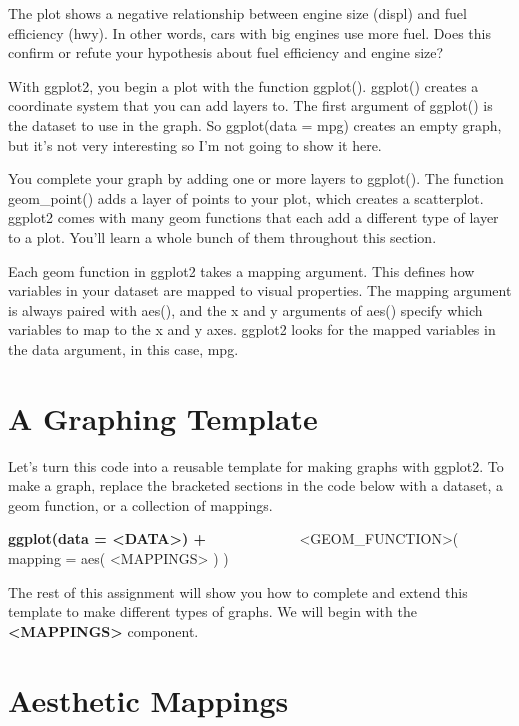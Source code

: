 \documentclass[
  letterpaper,
  DIV=11,
  numbers=noendperiod]{scrreprt}
\begin{document}
The plot shows a negative relationship between engine size (displ) and
fuel efficiency (hwy). In other words, cars with big engines use more
fuel. Does this confirm or refute your hypothesis about fuel efficiency
and engine size?

With ggplot2, you begin a plot with the function ggplot(). ggplot()
creates a coordinate system that you can add layers to. The first
argument of ggplot() is the dataset to use in the graph. So ggplot(data
= mpg) creates an empty graph, but it's not very interesting so I'm not
going to show it here.

You complete your graph by adding one or more layers to ggplot(). The
function geom\_point() adds a layer of points to your plot, which
creates a scatterplot. ggplot2 comes with many geom functions that each
add a different type of layer to a plot. You'll learn a whole bunch of
them throughout this section.

Each geom function in ggplot2 takes a mapping argument. This defines how
variables in your dataset are mapped to visual properties. The mapping
argument is always paired with aes(), and the x and y arguments of aes()
specify which variables to map to the x and y axes. ggplot2 looks for
the mapped variables in the data argument, in this case, mpg.

\section*{A Graphing Template}\label{a-graphing-template}


Let's turn this code into a reusable template for making graphs with
ggplot2. To make a graph, replace the bracketed sections in the code
below with a dataset, a geom function, or a collection of mappings.

\textbf{ggplot(data = \textless DATA\textgreater) +} \(\hspace{1in}\)
\textless GEOM\_FUNCTION\textgreater( mapping = aes(
\textless MAPPINGS\textgreater{} ) )

The rest of this assignment will show you how to complete and extend
this template to make different types of graphs. We will begin with the
\textbf{\textless MAPPINGS\textgreater{}} component.

\section*{Aesthetic Mappings}\label{aesthetic-mappings}
\end{document}
